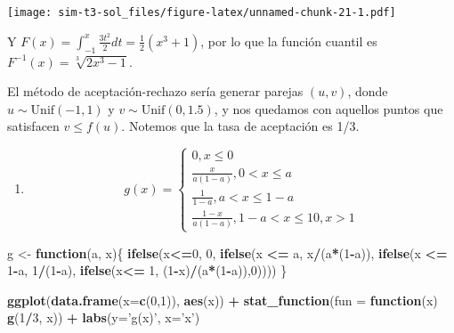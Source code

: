 \documentclass[]{article}
\newenvironment{Shaded}{\begin{snugshade}}{\end{snugshade}}
\newcommand{\ControlFlowTok}[1]{\textcolor[rgb]{0.13,0.29,0.53}{\textbf{#1}}}
\newcommand{\DataTypeTok}[1]{\textcolor[rgb]{0.13,0.29,0.53}{#1}}
\newcommand{\DecValTok}[1]{\textcolor[rgb]{0.00,0.00,0.81}{#1}}
\newcommand{\KeywordTok}[1]{\textcolor[rgb]{0.13,0.29,0.53}{\textbf{#1}}}
\newcommand{\NormalTok}[1]{#1}
\newcommand{\OperatorTok}[1]{\textcolor[rgb]{0.81,0.36,0.00}{\textbf{#1}}}
\newcommand{\StringTok}[1]{\textcolor[rgb]{0.31,0.60,0.02}{#1}}
\providecommand{\tightlist}{%
  \setlength{\itemsep}{0pt}\setlength{\parskip}{0pt}}
\begin{document}
\texttt{[image: sim-t3-sol\_files/figure-latex/unnamed-chunk-21-1.pdf]}

Y \(F(x) = \int_{-1}^x \frac{3t^2}{2} dt = \frac{1}{2}(x^3+1)\), por lo
que la función cuantil es \(F^{-1}(x) = \sqrt[3]{2x^3-1}\).

El método de aceptación-rechazo sería generar parejas \((u,v)\), donde
\(u \sim \textrm{Unif}(-1,1)\) y \(v \sim \textrm{Unif}(0,1.5)\), y nos
quedamos con aquellos puntos que satisfacen \(v \leq f(u)\). Notemos que
la tasa de aceptación es 1/3.

\begin{enumerate}
\def\labelenumi{\alph{enumi}.}
\setcounter{enumi}{1}
\tightlist
\item
  \[
  g(x) = 
  \begin{cases}
  0, x\leq 0 \\
  \frac{x}{a(1-a)}, 0 < x \leq a \\
  \frac{1}{1-a}, a < x \leq 1-a \\
  \frac{1-x}{a(1-a)}, 1-a < x \leq 1
  0, x  > 1
  \end{cases}
  \]
\end{enumerate}

\begin{Shaded}
\begin{Highlighting}[]
\NormalTok{g <-}\StringTok{ }\ControlFlowTok{function}\NormalTok{(a, x)\{}
  \KeywordTok{ifelse}\NormalTok{(x}\OperatorTok{<=}\DecValTok{0}\NormalTok{, }\DecValTok{0}\NormalTok{,}
         \KeywordTok{ifelse}\NormalTok{(x }\OperatorTok{<=}\StringTok{ }\NormalTok{a, x}\OperatorTok{/}\NormalTok{(a}\OperatorTok{*}\NormalTok{(}\DecValTok{1}\OperatorTok{-}\NormalTok{a)), }
                \KeywordTok{ifelse}\NormalTok{(x }\OperatorTok{<=}\StringTok{ }\DecValTok{1}\OperatorTok{-}\NormalTok{a, }\DecValTok{1}\OperatorTok{/}\NormalTok{(}\DecValTok{1}\OperatorTok{-}\NormalTok{a), }
                       \KeywordTok{ifelse}\NormalTok{(x}\OperatorTok{<=}\StringTok{ }\DecValTok{1}\NormalTok{, (}\DecValTok{1}\OperatorTok{-}\NormalTok{x)}\OperatorTok{/}\NormalTok{(a}\OperatorTok{*}\NormalTok{(}\DecValTok{1}\OperatorTok{-}\NormalTok{a)),}\DecValTok{0}\NormalTok{))))}
\NormalTok{\}}

\KeywordTok{ggplot}\NormalTok{(}\KeywordTok{data.frame}\NormalTok{(}\DataTypeTok{x=}\KeywordTok{c}\NormalTok{(}\DecValTok{0}\NormalTok{,}\DecValTok{1}\NormalTok{)), }\KeywordTok{aes}\NormalTok{(x)) }\OperatorTok{+}
\StringTok{  }\KeywordTok{stat_function}\NormalTok{(}\DataTypeTok{fun =} \ControlFlowTok{function}\NormalTok{(x) }\KeywordTok{g}\NormalTok{(}\DecValTok{1}\OperatorTok{/}\DecValTok{3}\NormalTok{, x)) }\OperatorTok{+}\StringTok{ }
\StringTok{  }\KeywordTok{labs}\NormalTok{(}\DataTypeTok{y=}\StringTok{'g(x)'}\NormalTok{, }\DataTypeTok{x=}\StringTok{'x'}\NormalTok{)}
\end{Highlighting}
\end{Shaded}
\end{document}

